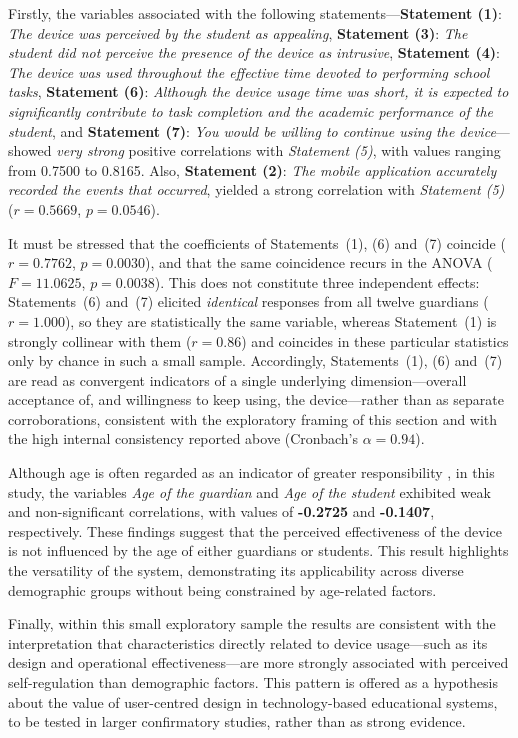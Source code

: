 Firstly, the variables associated with the following statements—\textbf{Statement (1)}: \textit{The device was perceived by the student as appealing}, \textbf{Statement (3)}: \textit{The student did not perceive the presence of the device as intrusive}, \textbf{Statement (4)}: \textit{The device was used throughout the effective time devoted to performing school tasks}, \textbf{Statement (6)}: \textit{Although the device usage time was short, it is expected to significantly contribute to task completion and the academic performance of the student}, and \textbf{Statement (7)}: \textit{You would be willing to continue using the device}—showed \textit{very strong} positive correlations with \textit{Statement (5)}, with values ranging from 0.7500 to 0.8165. Also, \textbf{Statement (2)}: \textit{The mobile application accurately recorded the events that occurred}, yielded a strong correlation with \textit{Statement (5)} (\(r=0.5669\), \(p=0.0546\)).

It must be stressed that the coefficients of Statements~(1), (6) and~(7) coincide (\(r=0.7762\), \(p=0.0030\)), and that the same coincidence recurs in the ANOVA (\(F=11.0625\), \(p=0.0038\)). This does not constitute three independent effects: Statements~(6) and~(7) elicited \emph{identical} responses from all twelve guardians (\(r=1.000\)), so they are statistically the same variable, whereas Statement~(1) is strongly collinear with them (\(r=0.86\)) and coincides in these particular statistics only by chance in such a small sample. Accordingly, Statements~(1), (6) and~(7) are read as convergent indicators of a single underlying dimension---overall acceptance of, and willingness to keep using, the device---rather than as separate corroborations, consistent with the exploratory framing of this section and with the high internal consistency reported above (Cronbach's \(\alpha=0.94\)).

Although age is often regarded as an indicator of greater responsibility \citep{Moss2018Why}, in this study, the variables \textit{Age of the guardian} and \textit{Age of the student} exhibited weak and non-significant correlations, with values of \textbf{-0.2725} and \textbf{-0.1407}, respectively. These findings suggest that the perceived effectiveness of the device is not influenced by the age of either guardians or students. This result highlights the versatility of the system, demonstrating its applicability across diverse demographic groups without being constrained by age-related factors.

Finally, within this small exploratory sample the results are consistent with the interpretation that characteristics directly related to device usage---such as its design and operational effectiveness---are more strongly associated with perceived self-regulation than demographic factors. This pattern is offered as a hypothesis about the value of user-centred design in technology-based educational systems, to be tested in larger confirmatory studies, rather than as strong evidence.

